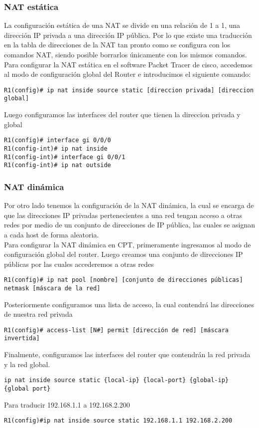 \documentclass[
	12pt, %
	fleqn, %
	a4paper, %
	oneside, %
]{LegrandOrangeBook}
\begin{document}
\subsubsection{NAT estática}
La configuración estática de una NAT se divide en una relación de 1 a 1, una dirección IP privada a una dirección IP pública. Por lo que existe una traducción en la tabla de direcciones de la NAT tan pronto como se configura con los comandos NAT, siendo posible borrarlos únicamente con los mismos comandos.
Para configurar la NAT estática en el software Packet Tracer de cisco, accedemos al modo de configuración global del Router e introducimos el siguiente comando:
\begin{lstlisting}[numbers=none]
R1(config)# ip nat inside source static [direccion privada] [direccion global]
\end{lstlisting}
Luego configuramos las interfaces del router que tienen la direccion privada y global
\begin{lstlisting}[numbers=none]
R1(config)# interface gi 0/0/0
R1(config-int)# ip nat inside
R1(config-int)# interface gi 0/0/1
R1(config-int)# ip nat outside
\end{lstlisting}
\subsubsection{NAT dinámica}
Por otro lado tenemos la configuración de la NAT dinámica, la cual se encarga de que las direcciones IP privadas pertenecientes a una red tengan acceso a otras redes por medio de un conjunto de direcciones de IP pública, las cuales se asignan a cada host de forma aleatoria.\\
Para configurar la NAT dinámica en CPT, primeramente ingresamos al modo de configuración global del router. Luego creamos una conjunto de direcciones IP públicas por las cuales accederemos a otras redes
\begin{lstlisting}[numbers=none]
R1(config)# ip nat pool [nombre] [conjunto de direcciones públicas] netmask [máscara de la red]
\end{lstlisting}
Posteriormente configuramos una lista de acceso, la cual contendrá las direcciones de nuestra red privada
\begin{lstlisting}[numbers=none]
R1(config)# access-list [N#] permit [dirección de red] [máscara invertida]
\end{lstlisting}
Finalmente, configuramos las interfaces del router que contendrán la red privada y la red global.
\begin{lstlisting}[numbers=none]
ip nat inside source static {local-ip} {local-port} {global-ip} {global port}
\end{lstlisting}
Para traducir 192.168.1.1 a 192.168.2.200
\begin{lstlisting}[numbers=none]
R1(config)#ip nat inside source static 192.168.1.1 192.168.2.200
\end{lstlisting}
\end{document}
